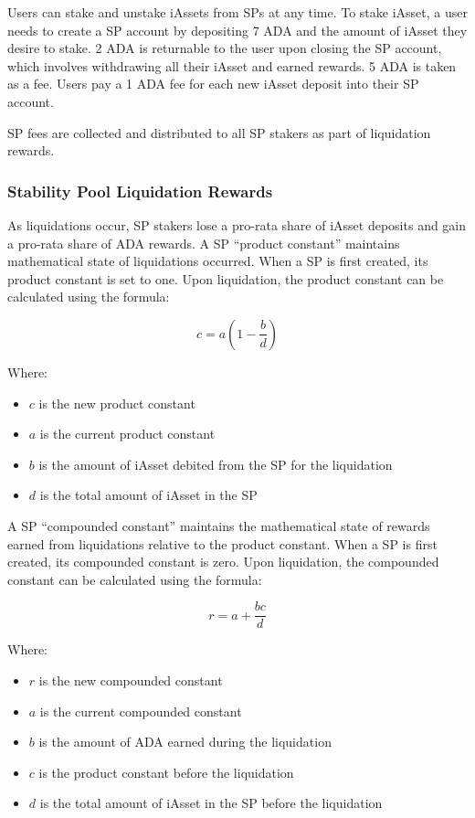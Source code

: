 \documentclass{article}
\begin{document}
\begin{sloppypar}
Users can stake and unstake iAssets from SPs at any time. To stake
iAsset, a user needs to create a SP account by depositing 7 ADA and the
amount of iAsset they desire to stake. 2 ADA is returnable to the user
upon closing the SP account, which involves withdrawing all their iAsset
and earned rewards. 5 ADA is taken as a fee. Users pay a 1 ADA fee for
each new iAsset deposit into their SP account.

SP fees are collected and distributed to all SP stakers as part of
liquidation rewards.

\hypertarget{stability-pool-liquidation-rewards}{%
\subsubsection{Stability Pool Liquidation
Rewards}\label{stability-pool-liquidation-rewards}}

As liquidations occur, SP stakers lose a pro-rata share of iAsset
deposits and gain a pro-rata share of ADA rewards. A SP ``product
constant'' maintains mathematical state of liquidations occurred. When a
SP is first created, its product constant is set to one. Upon
liquidation, the product constant can be calculated using the formula:

\[c=a\left ( 1 - \frac{b}{d} \right )\]

Where:

\begin{itemize}
\item
  \(c\) is the new product constant
\item
  \(a\) is the current product constant
\item
  \(b\) is the amount of iAsset debited from the SP for the liquidation
\item
  \(d\) is the total amount of iAsset in the SP
\end{itemize}

A SP ``compounded constant'' maintains the mathematical state of rewards
earned from liquidations relative to the product constant. When a SP is
first created, its compounded constant is zero. Upon liquidation, the
compounded constant can be calculated using the formula:

\[r = a + \frac{bc}{d}\]

Where:

\begin{itemize}
\item
  \(r\) is the new compounded constant
\item
  \(a\) is the current compounded constant
\item
  \(b\) is the amount of ADA earned during the liquidation
\item
  \(c\) is the product constant before the liquidation
\item
  \(d\) is the total amount of iAsset in the SP before the liquidation
\end{itemize}


\end{sloppypar}
\end{document}
